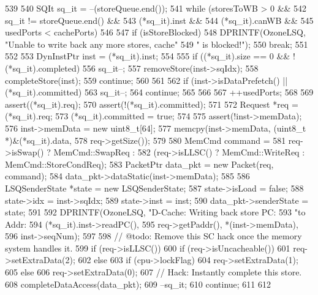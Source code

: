 \begin{DoxyCode}
539 {
540     SQIt sq_it = --(storeQueue.end());
541     while (storesToWB > 0 &&
542            sq_it != storeQueue.end() &&
543            (*sq_it).inst &&
544            (*sq_it).canWB &&
545            usedPorts < cachePorts) {
546 
547         if (isStoreBlocked) {
548             DPRINTF(OzoneLSQ, "Unable to write back any more stores, cache"
549                     " is blocked!\n");
550             break;
551         }
552 
553         DynInstPtr inst = (*sq_it).inst;
554 
555         if ((*sq_it).size == 0 && !(*sq_it).completed) {
556             sq_it--;
557             removeStore(inst->sqIdx);
558             completeStore(inst);
559             continue;
560         }
561 
562         if (inst->isDataPrefetch() || (*sq_it).committed) {
563             sq_it--;
564             continue;
565         }
566 
567         ++usedPorts;
568 
569         assert((*sq_it).req);
570         assert(!(*sq_it).committed);
571 
572         Request *req = (*sq_it).req;
573         (*sq_it).committed = true;
574 
575         assert(!inst->memData);
576         inst->memData = new uint8_t[64];
577         memcpy(inst->memData, (uint8_t *)&(*sq_it).data,
578                req->getSize());
579 
580         MemCmd command =
581             req->isSwap() ? MemCmd::SwapReq :
582             (req->isLLSC() ? MemCmd::WriteReq : MemCmd::StoreCondReq);
583         PacketPtr data_pkt = new Packet(req, command);
584         data_pkt->dataStatic(inst->memData);
585 
586         LSQSenderState *state = new LSQSenderState;
587         state->isLoad = false;
588         state->idx = inst->sqIdx;
589         state->inst = inst;
590         data_pkt->senderState = state;
591 
592         DPRINTF(OzoneLSQ, "D-Cache: Writing back store PC:%
593                 "to Addr:%
594                 (*sq_it).inst->readPC(),
595                 req->getPaddr(), *(inst->memData),
596                 inst->seqNum);
597 
598         // @todo: Remove this SC hack once the memory system handles it.
599         if (req->isLLSC()) {
600             if (req->isUncacheable()) {
601                 req->setExtraData(2);
602             } else {
603                 if (cpu->lockFlag) {
604                     req->setExtraData(1);
605                 } else {
606                     req->setExtraData(0);
607                     // Hack: Instantly complete this store.
608                     completeDataAccess(data_pkt);
609                     --sq_it;
610                     continue;
611                 }
612             }
}}}
\end{DoxyCode}
